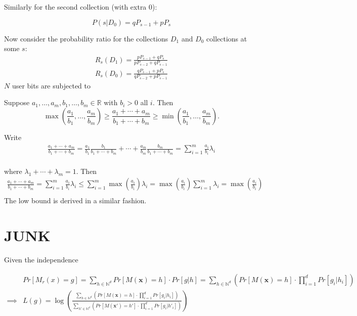 \documentclass[11pt]{article}
\newcommand{\bbx}{\pmb{x}}
\newcommand{\R}{\mathbb{R}}
\newcommand{\N}{\mathbb{N}}
\begin{document}
Similarly for the second collection (with extra 0):

\[ P(s | D_0) = qP_{s-1} + pP_s \]

Now consider the probability ratio for the collections $D_1$ and $D_0$ collections at some $s$:
\begin{align}
R_s(D_1) = \frac{ pP_{s-1} + qP_s }{pP_{s-2} + qP_{s-1}} \\
R_s(D_0) = \frac{ qP_{s-1} + pP_s }{qP_{s-2} + pP_{s-1}}
\end{align}
 $N$ user bits are subjected to  


\begin{lem} \label{lem:rsbound}
Suppose $a_1,\dots,a_m,b_1,\dots,b_m \in \R$ with $b_i > 0$ all $i$.
Then 
\[ \max\left(\frac{a_1}{b_1},\dots,\frac{a_m}{b_m}\right) \geq  \frac{a_1 + \cdots + a_m}{b_1 + \cdots + b_m} \geq \min \left(\frac{a_1}{b_1},\dots,\frac{a_m}{b_m}\right). \]
\end{lem}
\begin{pf}
Write
 \begin{align*}
  \frac{a_1 + \cdots + a_m}{b_1 + \cdots + b_m}
= \frac{a_1}{b_1}\frac{b_1}{b_1+\cdots+b_m} +
\cdots + \frac{a_m}{b_m}\frac{b_m}{b_1+\cdots+b_m} = \sum_{i=1}^m \frac{a_i}{b_i} \lambda_i  \\ 
\end{align*}

where $\lambda_1 + \cdots + \lambda_m = 1$.  Then
 \begin{align*}
  \frac{a_1 + \cdots + a_m}{b_1 + \cdots + b_m} = \sum_{i=1}^m \frac{a_i}{b_i} \lambda_i  \leq  \sum_{i=1}^m \max \left ( \frac{a_i}{b_i} \right ) \lambda_i  = \max \left ( \frac{a_i}{b_i} \right ) \sum_{i=1}^m \lambda_i = \max \left ( \frac{a_i}{b_i} \right ) \\ 
\end{align*}
The low bound is derived in a similar fashion. 
\end{pf}



\section{JUNK}


Given the independence 



 \begin{align*}
 & Pr [ M_r(x) = g ] = \sum_{h \in \N^d} Pr \left [  M(\bbx) = h \right ] \cdot Pr [ g | h ] =  \sum_{h \in \N^d} \left ( Pr \left [  M(\bbx) = h \right ] \cdot  \prod_{i=1}^d Pr[ g_i | h_i]  \right ) \\
\implies &  L(g) =  \log  \left ( \frac{  \sum_{h \in \N^d} \left ( Pr \left [  M(\bbx) = h \right ] \cdot  \prod_{i=1}^d Pr[ g_i | h_i]  \right )  }{    \sum_{h' \in \N^d} \left ( Pr \left [  M(\bbx') = h' \right ] \cdot  \prod_{i=1}^d Pr[ g_i | h'_i]  \right )  } \right )
\end{align*}
\end{document}

